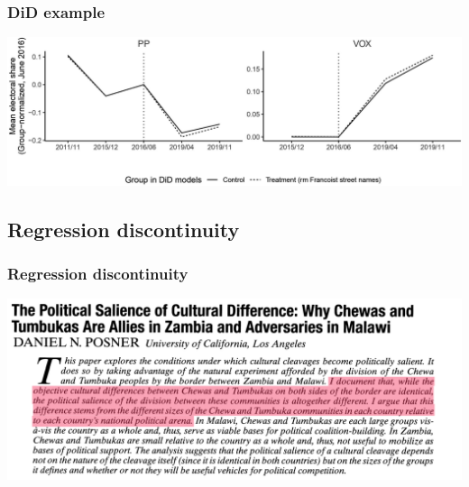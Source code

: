 \documentclass[aspectratio=43]{beamer}
\begin{document}
\begin{frame}
\frametitle{DiD example}
\centering

\includegraphics[width = \textwidth]{../img/did_TJ}

\end{frame}

\subsection{Regression discontinuity}

\begin{frame}
\frametitle{Regression discontinuity}
\centering

\includegraphics[width = \textwidth]{../img/posner1}

\end{frame}
\end{document}
